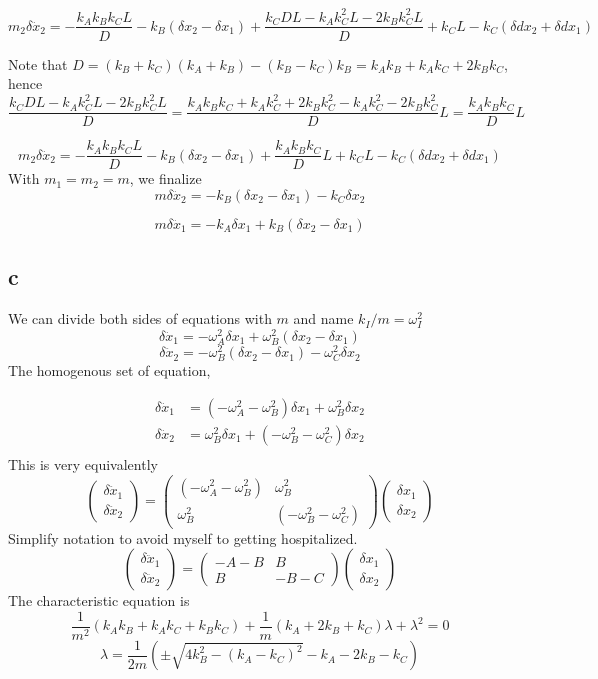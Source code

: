 \documentclass[letter]{article}
\begin{document}
\[
m_2 \delta \ddot x_2 = - \frac{k_A k_B k_C L}{D} - k_B (\delta x_2 - \delta x_1) + \frac{ k_C D L - k_A k_C^2 L- 2 k_B k_C^2L}{D}  +k_C L  - k_C (\delta d x_2 + \delta d x_1)
\] 

Note that $D = (k_B + k_C)(k_A +k_B) - (k_B - k_C) k_B =  k_A k_B + k_A k_C + 2 k_B k_C$, hence
\[
\frac{k_C D L - k_A k_C^2 L - 2 k_B k_C^2 L }{D} = 
\frac{k_A k_B k_C + k_A k_C^2 + 2 k_B k_C^2 - k_A k_C^2 - 2 k_B k_C^2 }{D} L = \frac{k_A k_B k_C}{D} L 
\]


\[
m_2 \delta \ddot x_2 = - \frac{k_A k_B k_C L}{D} - k_B (\delta x_2 - \delta x_1) + \frac{ k_A k_B k_C	}{D}L +k_C L   - k_C (\delta d x_2 + \delta d x_1)
\]
With $m_1 = m_2 = m$, we finalize 
\[
\boxed{
m \delta \ddot x_2 = -k_B (\delta x_2 - \delta x_1)  - k_C  \delta x_2 
} \] 

\[
\boxed{
m \delta \ddot x_1 = - k_A \delta x_1 + k_B (\delta x_2 - \delta x_1)
}
\] 

\subsection*{c} 
We can divide both sides of equations with $m$ and name $k_I / m = \omega_I^2$
\[
 \delta \ddot x_1 = - \omega_A^2 \delta x_1 + \omega_B^2 (\delta x_2 - \delta x_1) 
\] 
\[
 \delta \ddot x_2 = -\omega^2_B (\delta x_2 - \delta x_1)  - \omega^2_C  \delta x_2 
 \] 
The homogenous set of equation, 

 \begin{align*}
	 \delta \ddot x_1 &= (-\omega^2_A - \omega^2_B ) \delta x_1 + \omega_B^2 \delta x_2  \\
	 \delta \ddot x_2 &=\omega^2_B   \delta x_1 + (- \omega_B^2 - \omega_C^2 ) \delta x_2 \\
 \end{align*}
This is very equivalently
\[
\begin{pmatrix} \delta \ddot x_1 \\ \delta \ddot x_2 \end{pmatrix}  = 
\begin{pmatrix}  (-\omega^2_A - \omega^2_B ) & \omega_B^2 \\
	\omega^2_B & (- \omega_B^2 - \omega_C^2 ) 
\end{pmatrix}
\begin{pmatrix} \delta x_1 \\ \delta x_2 \end{pmatrix} 
\]
Simplify notation to avoid myself to getting hospitalized. 
\[
\begin{pmatrix} \delta \ddot x_1 \\ \delta \ddot x_2 \end{pmatrix}  = 
\begin{pmatrix}  -A-B  & B \\
	B & -B - C  
\end{pmatrix}
\begin{pmatrix} \delta x_1 \\ \delta x_2 \end{pmatrix} 
\]
The characteristic equation is 
\[
\frac{1}{m^2}	(k_A k_B + k_A k_C + k_B k_C) + \frac{1}{m} (k_A + 2 k_B + k_C) \lambda  + \lambda^2 = 0
\]
\[
\lambda = \frac{1}{2m} \left(
\pm \sqrt{4k_B^2 - (k_A - k_C)^2} - k_A - 2k_B - k_C 
\right)
\]
\end{document}
